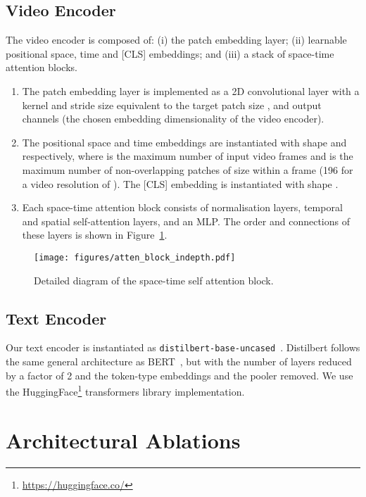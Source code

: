 \documentclass[10pt,twocolumn,letterpaper]{article}
\begin{document}
\subsection{Video Encoder}
The video encoder is composed of: (i) the patch embedding layer; (ii) learnable positional space, time and [CLS] embeddings; and (iii) a stack of  space-time attention blocks.
\begin{enumerate}
    \item The patch embedding layer is implemented as a 2D convolutional layer with a kernel and stride size equivalent to the target patch size , and  output channels (the chosen embedding dimensionality of the video encoder).
    \item The positional space and time embeddings are instantiated with shape  and  respectively, where  is the maximum number of input video frames and  is the maximum number of non-overlapping patches of size  within a frame (196 for a video resolution of ). The [CLS] embedding is instantiated with shape .
    \item Each space-time attention block consists of normalisation layers, temporal and spatial self-attention layers, and an MLP. The order and connections of these layers is shown in Figure~\ref{fig:atten_block_indepth}.
\end{enumerate}

\begin{figure}
    \centering
    \texttt{[image: figures/atten\_block\_indepth.pdf]}
    \caption{Detailed diagram of the space-time self attention block.}
    \label{fig:atten_block_indepth}
\end{figure}


\subsection{Text Encoder}

Our text encoder is instantiated as \texttt{distilbert-base-uncased}~\cite{distilbert}. Distilbert follows the same general architecture as BERT~\cite{devlin2019bert}, but with the number of layers reduced by a factor of 2 and the token-type embeddings and the pooler removed. We use the HuggingFace\footnote{\url{https://huggingface.co/}} transformers library implementation.


\section{Architectural Ablations}
\label{sec:arch_ablations}
\end{document}
